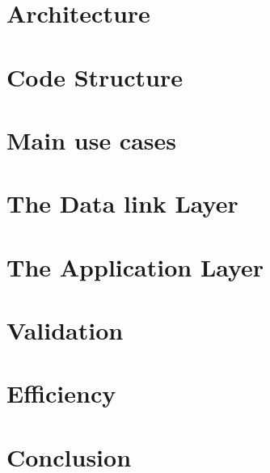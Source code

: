 \documentclass[11pt]{article}
\begin{document}
\section{Architecture}

\section{Code Structure}

\section{Main use cases}

\section{The Data link Layer}

\section{The Application Layer}

\section{Validation}

\section{Efficiency}

\section{Conclusion}
\end{document}
